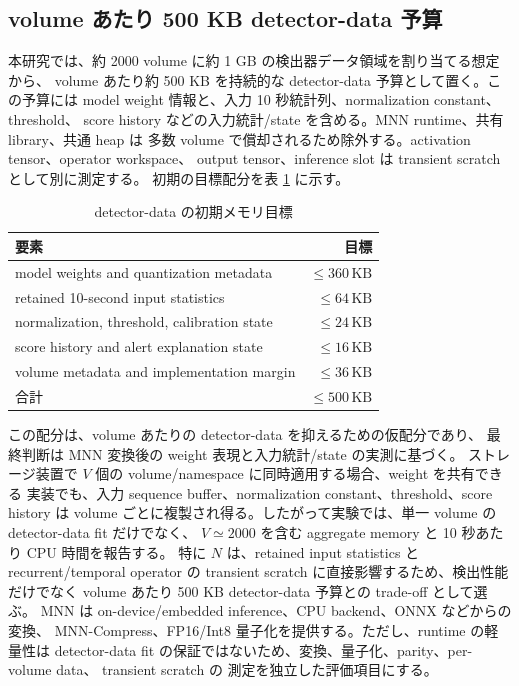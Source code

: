 \subsection{volume あたり 500 KB detector-data 予算}

本研究では、約 2000 volume に約 1 GB の検出器データ領域を割り当てる想定から、
volume あたり約 500 KB を持続的な detector-data 予算として置く。この予算には
model weight 情報と、入力 10 秒統計列、normalization constant、threshold、
score history などの入力統計/state を含める。MNN runtime、共有 library、共通 heap は
多数 volume で償却されるため除外する。activation tensor、operator workspace、
output tensor、inference slot は transient scratch として別に測定する。
初期の目標配分を表 \ref{tab:memory-budget} に示す。

\begin{table}[tb]
  \centering
  \caption{detector-data の初期メモリ目標}
  \label{tab:memory-budget}
  \begin{tabular}{lr}
    \toprule
    要素 & 目標 \\
    \midrule
    model weights and quantization metadata & $\leq 360\,\mathrm{KB}$ \\
    retained 10-second input statistics & $\leq 64\,\mathrm{KB}$ \\
    normalization, threshold, calibration state & $\leq 24\,\mathrm{KB}$ \\
    score history and alert explanation state & $\leq 16\,\mathrm{KB}$ \\
    volume metadata and implementation margin & $\leq 36\,\mathrm{KB}$ \\
    \midrule
    合計 & $\leq 500\,\mathrm{KB}$ \\
    \bottomrule
  \end{tabular}
\end{table}

この配分は、volume あたりの detector-data を抑えるための仮配分であり、
最終判断は MNN 変換後の weight 表現と入力統計/state の実測に基づく。
ストレージ装置で $V$ 個の volume/namespace に同時適用する場合、weight を共有できる
実装でも、入力 sequence buffer、normalization constant、threshold、score history は
volume ごとに複製され得る。したがって実験では、単一 volume の detector-data fit だけでなく、
$V \simeq 2000$ を含む aggregate memory と 10 秒あたり CPU 時間を報告する。
特に $N$ は、retained input statistics と recurrent/temporal operator の
transient scratch に直接影響するため、検出性能だけでなく volume あたり 500 KB detector-data 予算との
trade-off として選ぶ。
MNN は on-device/embedded inference、CPU backend、ONNX などからの変換、
MNN-Compress、FP16/Int8 量子化を提供する\cite{mnn}。ただし、runtime の軽量性は
detector-data fit の保証ではないため、変換、量子化、parity、per-volume data、
transient scratch の
測定を独立した評価項目にする。
